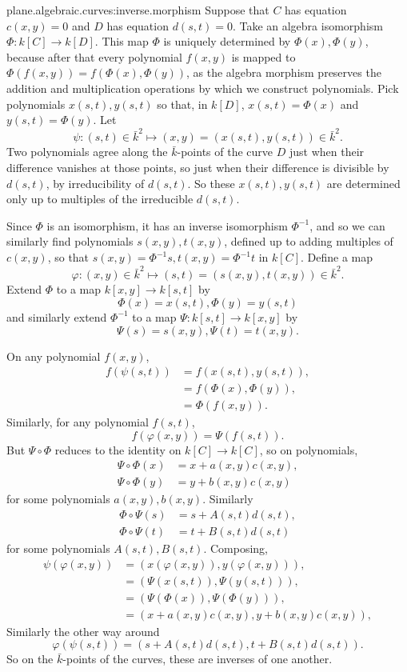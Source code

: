 \begin{answer}{plane.algebraic.curves:inverse.morphism}
Suppose that \(C\) has equation \(c(x,y)=0\) and \(D\) has equation \(d(s,t)=0\).
Take an algebra isomorphism \(\Phi\colon k[C]\to k[D]\).
This map \(\Phi\) is uniquely determined by \(\Phi(x),\Phi(y)\), because after that every polynomial \(f(x,y)\) is mapped to \(\Phi(f(x,y))=f(\Phi(x),\Phi(y))\), as the algebra morphism preserves the addition and multiplication operations by which we construct polynomials.
Pick polynomials \(x(s,t),y(s,t)\) so that, in \(k[D]\), \(x(s,t)=\Phi(x)\) and \(y(s,t)=\Phi(y)\).
Let
\[
\psi\colon (s,t)\in\bar{k}^2\mapsto(x,y)=(x(s,t),y(s,t))\in\bar{k}^2.
\]
Two polynomials agree along the \(\bar{k}\)-points of the curve \(D\) just when their difference vanishes at those points, so just when their difference is divisible by \(d(s,t)\), by irreducibility of \(d(s,t)\).
So these \(x(s,t),y(s,t)\) are determined only up to multiples of the irreducible \(d(s,t)\).

Since \(\Phi\) is an isomorphism, it has an inverse isomorphism \(\Phi^{-1}\), and so we can similarly find polynomials \(s(x,y),t(x,y)\), defined up to adding multiples of \(c(x,y)\), so that \(s(x,y)=\Phi^{-1}s,t(x,y)=\Phi^{-1}t\) in \(k[C]\).
Define a map
\[
\varphi\colon (x,y)\in\bar{k}^2\mapsto(s,t)=(s(x,y),t(x,y))\in\bar{k}^2.
\]
Extend \(\Phi\) to a map \(k[x,y]\to k[s,t]\) by 
\[
\Phi(x)=x(s,t), \Phi(y)=y(s,t)
\]
and similarly extend \(\Phi^{-1}\) to a map \(\Psi\colon k[s,t]\to k[x,y]\) by 
\[
\Psi(s)=s(x,y), \Psi(t)=t(x,y).
\]

On any polynomial \(f(x,y)\),
\begin{align*}
f(\psi(s,t))
&=
f(x(s,t),y(s,t)),
\\
&=
f(\Phi(x),\Phi(y)),
\\
&=
\Phi(f(x,y)).
\end{align*}
Similarly, for any polynomial \(f(s,t)\), 
\[
f(\varphi(x,y))=\Psi(f(s,t)).
\]
But \(\Psi\circ\Phi\) reduces to the identity on \(k[C]\to k[C]\), so on polynomials,
\begin{align*}
\Psi\circ\Phi(x)&=x+a(x,y)c(x,y),\\
\Psi\circ\Phi(y)&=y+b(x,y)c(x,y)
\end{align*}
for some polynomials \(a(x,y),b(x,y)\).
Similarly
\begin{align*}
\Phi\circ\Psi(s)&=s+A(s,t)d(s,t),\\
\Phi\circ\Psi(t)&=t+B(s,t)d(s,t)
\end{align*}
for some polynomials \(A(s,t),B(s,t)\).
Composing,
\begin{align*}
\psi(\varphi(x,y))
&=
(x(\varphi(x,y)),y(\varphi(x,y))),
\\
&=
(\Psi(x(s,t)),\Psi(y(s,t))),
\\
&=
(\Psi(\Phi(x)),\Psi(\Phi(y))),
\\
&=
(x+a(x,y)c(x,y),y+b(x,y)c(x,y)),
\end{align*}
Similarly the other way around
\[
\varphi(\psi(s,t))=(s+A(s,t)d(s,t),t+B(s,t)d(s,t)).
\]
So on the \(\bar{k}\)-points of the curves, these are inverses of one another.
\end{answer}

